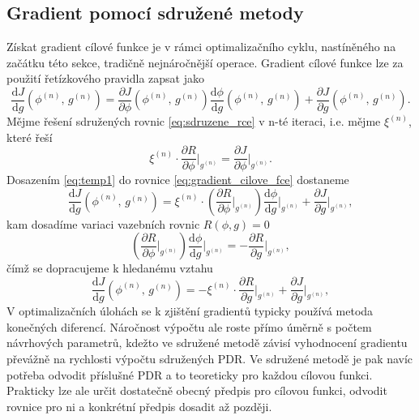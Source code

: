 \subsection{Gradient pomocí sdružené metody}
Získat gradient cílové funkce je v rámci optimalizačního cyklu, nastíněného na začátku této sekce, tradičně nejnáročnější operace. Gradient cílové funkce lze za použití řetízkového pravidla zapsat jako
\begin{equation}\label{eq:gradient_cilove_fce}
\dfrac
{\mathrm{d}J}
{\mathrm{d}g} (\phi^{(n)}, \, g^{(n)})
=
\dfrac
{\partial J}
{\partial \phi }(\phi^{(n)}, \, g^{(n)})
\dfrac
{\mathrm{d}\phi}
{\mathrm{d}g}(\phi^{(n)}, \, g^{(n)})
+
\dfrac
{\partial J}
{\partial g}(\phi^{(n)}, \, g^{(n)}).
\end{equation}
Mějme řešení sdružených rovnic \ref{eq:sdruzene_rce} v n-té iteraci, i.e. mějme $ \xi^{(n)} $, které řeší
\begin{equation}\label{eq:temp1}
\xi^{(n)} \cdot \dfrac{\partial R}{\partial \phi} \Bigr|_{g^{(n)}}=\dfrac{\partial J}{\partial \phi}\Bigr|_{g^{(n)}}.
\end{equation}
Dosazením \ref{eq:temp1} do rovnice \ref{eq:gradient_cilove_fce} dostaneme 
\begin{equation*}
\dfrac{\mathrm{d}J}
{\mathrm{d}g} (\phi^{(n)}, \, g^{(n)})
=
\xi^{(n)} 
\cdot 
\left(
\dfrac{\partial R}
{\partial \phi}\Bigr|_{g^{(n)}}
\right)
\dfrac{\mathrm{d}\phi}
{\mathrm{d}g}\Bigr|_{g^{(n)}}
+
\dfrac{\partial J}
{\partial g}\Bigr|_{g^{(n)}},
\end{equation*}
kam dosadíme variaci vazebních rovnic $ R(\phi,g)=0 $
\begin{equation*}
\left(
\dfrac{\partial R}
{\partial \phi}\Bigr|_{g^{(n)}}
\right)
\dfrac{\mathrm{d}\phi}
{\mathrm{d}g}\Bigr|_{g^{(n)}}
=
-\dfrac{\partial R}
{\partial g}\Bigr|_{g^{(n)}},
\end{equation*}
čímž se dopracujeme k hledanému vztahu
\begin{equation*}
\dfrac{\mathrm{d}J}
{\mathrm{d}g} (\phi^{(n)}, \, g^{(n)})
=
-\xi^{(n)} 
\cdot 
\dfrac{\partial R}
{\partial g}\Bigr|_{g^{(n)}}
+
\dfrac{\partial J}
{\partial g}\Bigr|_{g^{(n)}},
\end{equation*}
V optimalizačních úlohách se k zjištění gradientů typicky používá metoda konečných diferencí. Náročnost výpočtu ale roste přímo úměrně s počtem návrhových parametrů, kdežto ve sdružené metodě závisí vyhodnocení gradientu převážně na rychlosti výpočtu sdružených PDR. Ve sdružené metodě je pak navíc potřeba odvodit příslušné PDR a to teoreticky pro každou cílovou funkci. Prakticky lze ale určit dostatečně obecný předpis pro cílovou funkci, odvodit rovnice pro ni a konkrétní předpis dosadit až později.

